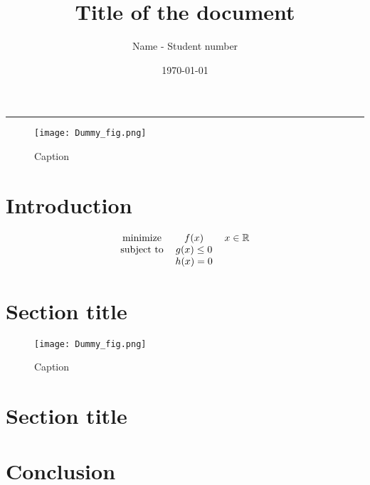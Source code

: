 \documentclass[twocolumn, fontsize=10pt]{article}
\title{
\Large Title of the document  \\
[10pt]
}
\date{\today}
\author{Name - Student number}
\makeatletter
\renewenvironment{abstract} %
 {\small
  \begin{center}
  \bfseries \abstractname\vspace{-.5em}\vspace{0pt}
  \end{center}
  \list{}{%
    \setlength{\leftmargin}{0mm}
    \setlength{\rightmargin}{\leftmargin}%
  }
  \item\relax}
 {\endlist}
\renewcommand{\maketitle}{\bgroup\setlength{\parindent}{0pt} %
\begin{flushleft}
  \textbf{\@title}
  \@author \\
  \@date
\end{flushleft}\egroup
}
\makeatother
\begin{document}
\twocolumn[ \maketitle ]

\begin{abstract}
\end{abstract}

\rule{\linewidth}{0.5pt}


\begin{figure*}
    \centering
    \texttt{[image: Dummy\_fig.png]}
    \caption{Caption}
\end{figure*}


\section{Introduction}
 \lipsum[2]
\begin{equation}  %
      \begin{tabular}{c c c}
           minimize & $f(x)$ & $x \in \mathbb{R} $\\
           subject to & $g(x)\leq 0 $&  \\
           & $h(x) = 0$& \\
      \end{tabular}
  \end{equation}
\lipsum[1]

\section{Section title}
\lipsum[1-2]
\begin{figure}[H]
    \centering
    \texttt{[image: Dummy\_fig.png]}
    \caption{Caption}
\end{figure}
\lipsum[1]

\section{Section title}
\lipsum[1-2]

\section{Conclusion}
\lipsum [4-5]


\begin{thebibliography}{}
\end{thebibliography}


 
\end{document}
